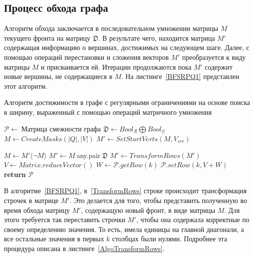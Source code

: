 \subsection{Процесс обхода графа}

Алгоритм обхода заключается в последовательном умножении матрицы $M$ текущего фронта на матрицу $\mathfrak{D}$. В результате чего, находится матрица $M'$ содержащая информацию о вершинах, достижимых на следующем шаге. Далее, с помощью операций перестановки и сложения векторов $M'$ преобразуется к виду матрицы $M$ и присваивается ей. Итерации продолжаются пока $M'$ содержит новые вершины, не содержащиеся в $M$. На листинге~\ref{BFSRPQ1} представлен этот алгоритм.

\begin{algorithm}[t]
  \caption{Алгоритм достижимости в графе с регулярными ограничениями на основе поиска в ширину, выраженный с помощью операций матричного умножения}\label{BFSRPQ1}
  \begin{algorithmic}[1]
    \State $\mathcal{P}\gets~${Матрица смежности графа}
    \State $\mathfrak{D}\gets Bool_\mathcal{R} \bigoplus Bool_\mathcal{G}$
    \State $M\gets CreateMasks(|Q|,|V|)$ 
    \State $M'\gets SetStartVerts(M, V_{src})$  
    
      \State $M\gets M'\langle\neg M\rangle$
        \State $M'\gets M~$any.pair$~\mathfrak{D}$
        \State $M'\gets TransformRows(M')$\label{TransformRows}
      \EndFor
        \State $V\gets Matrix.reduceVector()$ 
            \State $W\gets\mathcal{P}.getRow(k)$
            \State $\mathcal{P}.setRow(k, V+W)$
      \EndFor
    \EndWhile
    \State \textbf{return} $\mathcal{P}$
    \EndProcedure
  \end{algorithmic}
\end{algorithm}

В алгоритме~\ref{BFSRPQ1}, в~\ref{TransformRows} строке происходит трансформация строчек в матрице $M'$. Это делается для того, чтобы представить полученную во время обхода матрицу $M'$, содержащую новый фронт, в виде матрицы $M$. Для этого требуется так переставить строчки $M'$, чтобы она содержала корректные по своему определению значения. То есть, имела единицы на главной диагонали, а все остальные значения в первых $k$ столбцах были нулями. Подробнее эта процедура описана в листинге~\ref{AlgoTransformRows}.

